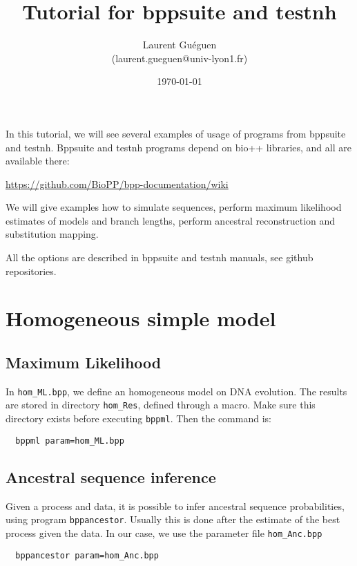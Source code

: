 \documentclass{article}
\title{Tutorial for bppsuite and testnh}
\date{\today}
\author{Laurent Guéguen \\ {\small (laurent.gueguen@univ-lyon1.fr)}}
\begin{document}
\maketitle
\thispagestyle{empty}

\medskip 


In this tutorial, we will see several examples of usage of programs
from bppsuite and testnh. Bppsuite and testnh programs depend on bio++
libraries, and all are available there:

\url{https://github.com/BioPP/bpp-documentation/wiki}

\medskip

We will give examples how to simulate sequences, perform maximum
likelihood estimates of models and branch lengths, perform ancestral
reconstruction and substitution mapping.

All the options are described in bppsuite and testnh manuals, see
github repositories. 


\section{Homogeneous simple model}

\subsection*{Maximum Likelihood}

In \texttt{hom\_ML.bpp}, we define an homogeneous model on DNA evolution.
The results are stored in directory \texttt{hom\_Res}, defined through
a macro. Make sure this directory exists before executing
\texttt{bppml}. Then the command is:

\begin{verbatim}
  bppml param=hom_ML.bpp
\end{verbatim}

\subsection*{Ancestral sequence inference}

Given a process and data, it is possible to infer ancestral sequence
probabilities, using program \texttt{bppancestor}. Usually this is
done after the estimate of the best process given the data. In our
case, we use the parameter file \texttt{hom\_Anc.bpp}

\begin{verbatim}
  bppancestor param=hom_Anc.bpp
\end{verbatim}
\end{document}
